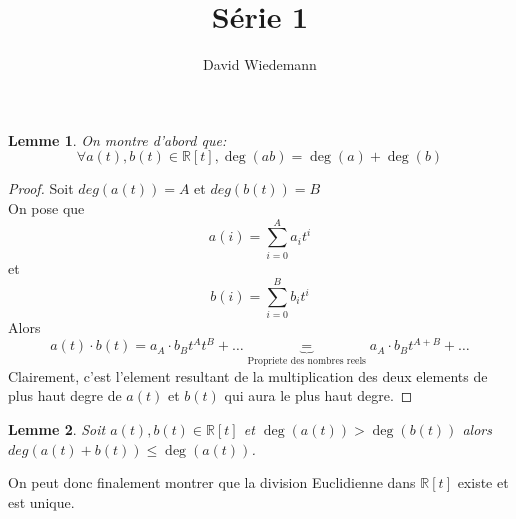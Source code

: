 \documentclass[11pt, a4paper, twoside]{article}
\newtheorem{lemma}{Lemme}
\begin{document}
\title{Série 1}
\author{David Wiedemann}
\maketitle

\begin{lemma}
On montre d'abord que:
\[ 
	\forall a(t) , b(t) \in \mathbb{R}[t], \deg (ab) = \deg(a) + \deg(b)
\]

\end{lemma}
\begin{proof}
Soit $deg(a(t)) = A$ et $deg(b(t)) = B$ \\
On pose que 
\[ 
	a(i) = \sum_{i=0}^{A} a_i t^{i}	
\]
et 
\[ 
	b(i) = \sum_{i=0}^{B} b_i t^{i}
\]
Alors
\[ 
	a(t) \cdot b(t) = a_{A} \cdot b_{B} t^{A} t^{B} + \ldots \underbrace{ = }_{\text{Propriete des nombres reels}} a_{A} \cdot b_{B} t^{A+B} + \ldots
\]
Clairement, c'est l'element resultant de la multiplication des deux elements de plus haut degre de $a(t)$ et $b(t)$ qui aura le plus haut degre.
\end{proof}
\begin{lemma}
	Soit $a(t), b(t) \in \mathbb{R}[t]$ et $\deg(a(t))>\deg(b(t))$ alors $deg(a(t) + b(t)) \leq \deg (a(t))$.
\end{lemma}
On peut donc finalement montrer que la division Euclidienne dans $\mathbb{R}[t]$ existe et est unique.
\end{document}
